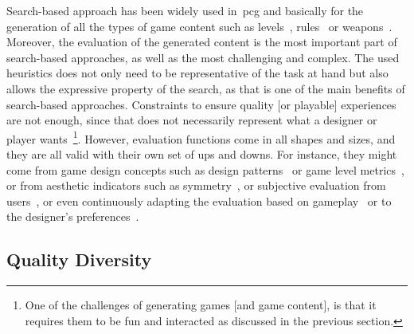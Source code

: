 Search-based approach has been widely used in~\acrshort{pcg} and basically for the generation of all the types of game content such as levels~\cite{dormans_generating_2011}, rules~\cite{font_towards_2013} or weapons~\cite{gravina_surprise_2016}. Moreover, the evaluation of the generated content is the most important part of search-based approaches, as well as the most challenging and complex. The used heuristics does not only need to be representative of the task at hand but also allows the expressive property of the search, as that is one of the main benefits of search-based approaches. Constraints to ensure quality [or playable] experiences are not enough, since that does not necessarily represent what a designer or player wants~\footnote{One of the challenges of generating games [and game content], is that it requires them to be fun and interacted as discussed in the previous section.}. However, evaluation functions come in all shapes and sizes, and they are all valid with their own set of ups and downs. For instance, they might come from  game design concepts such as design patterns~\cite{dahlskog_patterns_2015} or game level metrics~\cite{canossa_towards_2015}, or from aesthetic indicators such as symmetry~\cite{marino_empirical_2015}, or subjective evaluation from users~\cite{schrum_interactive_2020}, or even continuously adapting the evaluation based on gameplay~\cite{hastings_evolving_2009} or to the designer's preferences~\cite{liapis_adapting_2012}.



\subsection{Quality Diversity} \label{sec:Backqd}

